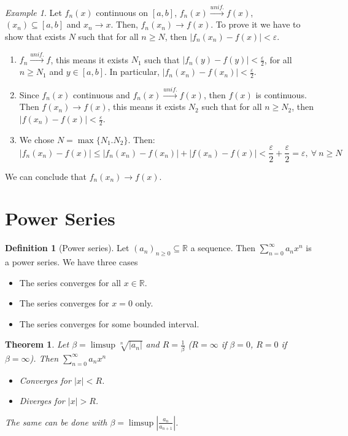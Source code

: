 \documentclass{article}
\newcommand{\DS}{\displaystyle}
\newcommand{\abs}[1]{\left|#1\right|}
\newenvironment{enumarabic}{\begin{enumerate}[label=(\arabic*)]}{\end{enumerate}}
\newcommand{\intcc}[1]{\left[#1\right]}
\newcommand{\tounif}{\xrightarrow{unif.}}
\theoremstyle{definition}
\newtheorem{definition}{Definition}[section]
\theoremstyle{definition}
\theoremstyle{plain}
\newtheorem{theorem}{Theorem}[section]
\theoremstyle{plain}
\theoremstyle{plain}
\theoremstyle{plain}
\theoremstyle{definition}
\theoremstyle{remark}
\theoremstyle{remark}
\theoremstyle{remark}
\newtheorem{examplet}{Example}[theorem]
\theoremstyle{remark}
\newcommand{\R}{\mathbb{R}}
\newcommand{\pseries}[1]{\sum_{n=0}^\infty #1}
\newcommand{\ForAll}{\ \forall \ }
\newcommand{\E}{\varepsilon}
\begin{document}
\begin{examplet}
  Let $f_n(x)$ continuous on $\intcc{a,b}$, $f_n(x) \tounif f(x)$, $(x_n) \subseteq \intcc{a,b}$ and $x_n \to x$. Then, $f_n(x_n) \to f(x)$. To prove it we have to show that exists $N$ such that for all $n \geq N$, then $\abs{f_n(x_n) - f(x)} < \E$.
  \begin{enumarabic}
  \item $f_n \tounif f$, this means it exists $N_1$ such that $\abs{f_n(y) - f(y)} < \frac{\E}{2}$, for all $n \geq N_1$ and $y \in \intcc{a,b}$. In particular, $\abs{f_n(x_n) - f(x_n)} < \frac{\E}{2}$.
  \item Since $f_n(x)$ continuous and $f_n(x) \tounif f(x)$, then $f(x)$ is continuous. Then $f(x_n) \to f(x)$, this means it exists $N_2$ such that for all $n \geq N_2$, then $\abs{f(x_n) - f(x)} < \frac{\E}{2}$.
  \item We chose $N = \max \{ N_1. N_2 \}$. Then:
    \[
    \abs{f_n(x_n) - f(x)} \leq \abs{f_n(x_n) - f(x_n)} + \abs{f(x_n) - f(x)} <
    \frac{\E}{2} + \frac{\E}{2} = \E, \ForAll n \geq N
    \]
  \end{enumarabic}
  We can conclude that $f_n(x_n) \to f(x)$.
\end{examplet}


\section{Power Series}


\begin{definition}[Power series]
  Let $(a_n)_{n \geq 0} \subseteq \R$ a sequence. Then $\pseries{a_n x^n}$ is a power series. We have three cases
  \begin{itemize}
  \item The series converges for all $x \in \R$.
  \item The series converges for $x = 0$ only.
  \item The series converges for some bounded interval.
  \end{itemize}
\end{definition}


\begin{theorem}
  Let $\beta = \limsup \sqrt[n]{|a_n|}$ and $R = \frac{1}{\beta}$ ($R = \infty$ if $\beta = 0$, $R = 0$ if $\beta = \infty$). Then $\DS \pseries{a_n x^n}$
  \begin{itemize}
  \item Converges for $|x| < R$.
  \item Diverges for $|x| > R$.
  \end{itemize}
  The same can be done with $\beta = \limsup \abs{\frac{a_n}{a_{n+1}}}$.
\end{theorem}
\end{document}
